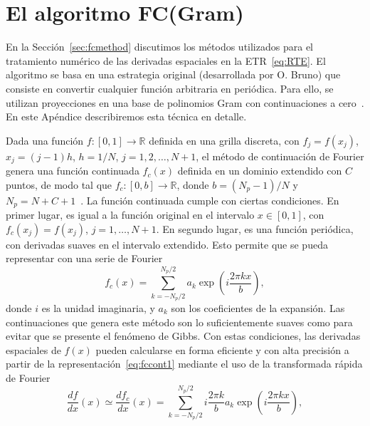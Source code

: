 \chapter{El algoritmo FC(Gram)}
\label{ap:fcgram}

En la Sección~\ref{sec:fcmethod} discutimos los métodos utilizados para el tratamiento numérico de las derivadas espaciales en la ETR~\eqref{eq:RTE}. 
El algoritmo se basa en una estrategia original (desarrollada 
por O. Bruno) que consiste 
en convertir cualquier función arbitraria en periódica.  
 Para ello, se utilizan proyecciones en una base 
de polinomios Gram con continuaciones a cero~\cite{Amlani2016}. En este Apéndice describiremos esta técnica en detalle.


Dada una función  $f:[0,1]\rightarrow \mathbb{R}$ definida en una grilla discreta, 
con $f_j=f(x_j)$, $x_j=(j-1)h$, $h=1/N$, $j=1,2,\ldots,N+1$, el método de continuación de 
Fourier genera una función continuada $f_c(x)$  
definida en un dominio extendido con $C$ puntos, 
de modo tal que $f_c: [0,b] \rightarrow \mathbb{R}$, 
donde $b=(N_p-1)/N$ y $N_p=N+C+1$~\cite{Albin2011,Amlani2016}. 
La función continuada cumple con ciertas condiciones. 
En primer lugar, es igual a la función original en el intervalo $x\in[0,1]$, con $f_c(x_j)=f(x_j)$, $j=1,\ldots,N+1$.
En segundo lugar, es una función periódica, con  
derivadas suaves en el intervalo extendido.
Esto permite que se pueda representar con una serie de Fourier 
\begin{equation}
f_c(x)=\sum_{k=-N_p/2}^{N_p/2} a_k \exp\left( i \frac{2\pi  k x}{b} \right),
\label{eq:fccont1}
\end{equation}
donde $i$ es la unidad imaginaria, y $a_k$ son los coeficientes 
de la expansión. Las continuaciones que genera 
este método son lo suficientemente suaves como 
para evitar que se presente el fenómeno de Gibbs. Con 
estas condiciones, las derivadas espaciales de $f(x)$ 
pueden calcularse en forma eficiente y con alta precisión a partir de la representación~\eqref{eq:fccont1} mediante el uso de la transformada rápida de Fourier
\begin{equation}
\frac{df}{dx}(x)\simeq \frac{df_c}{dx}(x)=\sum_{k=-N_p/2}^{N_p/2} i\frac{2\pi  k}{b} a_k \exp\left( i\frac{2\pi  k x}{b} \right),
\label{eq:fccont2}
\end{equation}

